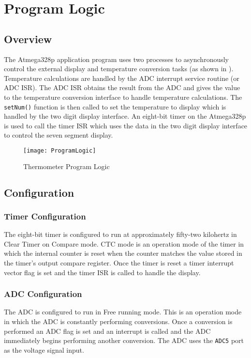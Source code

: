 \documentclass[main.tex]{subfiles}
\begin{document}
\chapter{Program Logic} 
	\section{Overview}
	The Atmega328p application program uses two processes to asynchronously
	control the external display and temperature conversion tasks (as shown in
	). Temperature calculations are handled by the ADC
	interrupt service routine (or ADC ISR). The ADC ISR obtains the result from
	the ADC and gives the value to the temperature conversion interface to handle
	temperature calculations.  The \lstinline{setNum()} function is then called to
	set the temperature to display which is handled by the two digit display
	interface. An eight-bit timer on the Atmega328p is used to call the timer ISR
	which uses the data in the two digit display interface to control the seven
	segment display.

	\begin{figure}[H]
		\begin{center}
			\texttt{[image: ProgramLogic]}
		\end{center}
		\caption{Thermometer Program Logic}
		\label{fig:progLogic}
	\end{figure}

	\section{Configuration}
		\subsection{Timer Configuration}
		The eight-bit timer is configured to run at approximately fifty-two kilohertz
		in Clear Timer on Compare mode. CTC mode is an operation mode of the timer in
		which the internal counter is reset when the counter matches the value stored
		in the timer's output compare register. Once the timer is reset a timer
		interrupt vector flag is set and the timer ISR is called to handle the display.

		\subsection{ADC Configuration}
		The ADC is configured to run in Free running mode. This is an operation mode
		in which the ADC is constantly performing conversions. Once a conversion is
		performed an ADC flag is set and an interrupt is called and the ADC
		immediately begins performing another conversion. The ADC uses the
		\lstinline{ADC5} port as the voltage signal input. 
\end{document}
